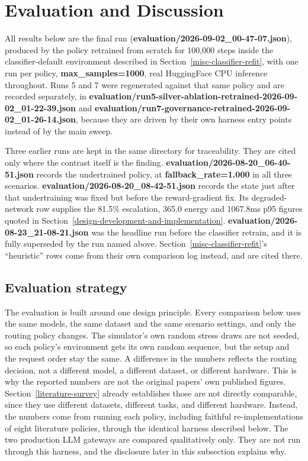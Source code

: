 \hypertarget{evaluation-and-discussion}{%
\section{Evaluation and Discussion}\label{evaluation-and-discussion}}

All results below are the final run
(\textbf{evaluation/2026-09-02\_00-47-07.json}), produced by the
policy retrained from scratch for 100,000 steps inside the
classifier-default environment described in Section~\ref{misc-classifier-refit}, with one run
per policy, \textbf{max\_samples=1000}, real HuggingFace CPU inference
throughout. Runs 5 and 7 were regenerated against that same policy and
are recorded separately, in
\textbf{evaluation/run5-silver-ablation-retrained-2026-09-02\_01-22-39.json}
and
\textbf{evaluation/run7-governance-retrained-2026-09-02\_01-26-14.json},
because they are driven by their own harness entry points instead of
by the main sweep.

Three earlier runs are kept in the same directory for traceability.
They are cited only where the contrast itself is the finding.
\textbf{evaluation/2026-08-20\_06-40-51.json} records the undertrained
policy, at \textbf{fallback\_rate=1.000} in all three scenarios.
\textbf{evaluation/2026-08-20\_08-42-51.json} records the state just
after that undertraining was fixed but before the reward-gradient fix.
Its degraded-network row supplies the 81.5\% escalation, 365.0 energy
and 1067.8ms p95 figures quoted in Section~\ref{design-development-and-implementation}.
\textbf{evaluation/2026-08-23\_21-08-21.json} was the headline run
before the classifier retrain, and it is fully superseded by the run
named above. Section~\ref{misc-classifier-refit}'s ``heuristic'' rows come from their own
comparison log instead, and are cited there.

\hypertarget{evaluation-strategy}{%
\subsection{Evaluation strategy}\label{evaluation-strategy}}

The evaluation is built around one design principle. Every comparison
below uses the same models, the same dataset and the same scenario
settings, and only the routing policy changes. The simulator's own
random stress draws are not seeded, so each policy's environment gets
its own random sequence, but the setup
and the request order stay the same. A difference in the numbers
reflects the routing decision, not a different model, a different
dataset, or different hardware. This is why the
reported numbers are not the original papers' own published figures.
Section~\ref{literature-survey} already establishes those are not directly comparable, since
they use different datasets, different tasks, and different hardware.
Instead, the numbers come from running each policy, including faithful
re-implementations of eight literature policies, through the identical
harness described below. The two production LLM gateways are compared
qualitatively only. They are not run through this harness, and the
disclosure later in this subsection explains why.

